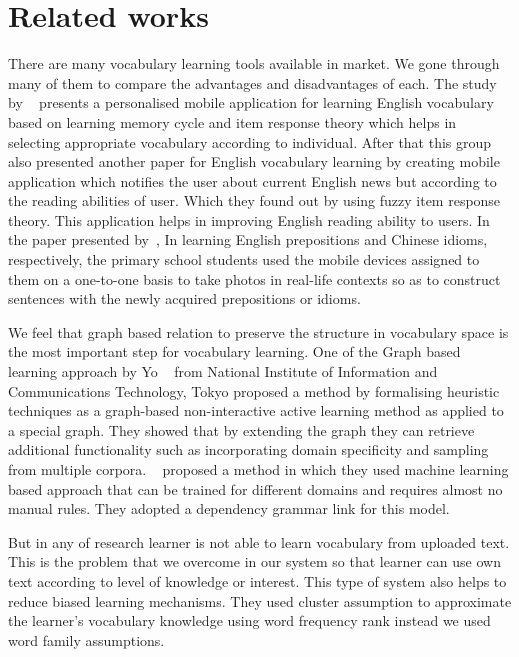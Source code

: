 \documentclass[11pt,a4paper]{article}
\begin{document}
\section{Related works}
There are many vocabulary learning tools available in market. We gone through many of them to compare the advantages and disadvantages of each. The study by ~\citet{chen2008personalized} presents a personalised mobile application for learning English vocabulary based on learning memory cycle and item response theory which helps in selecting appropriate vocabulary according to individual. After that this group also presented another paper for English vocabulary learning by creating mobile application which notifies the user about current English news but according to the reading abilities of user. Which they found out by using fuzzy item response theory. This application helps in improving English reading ability to users. In the paper presented by~\citet{wong2010mobile}, In learning English prepositions and Chinese idioms, respectively, the primary school students used the mobile devices assigned to them on a one-to-one basis to take photos in real-life contexts so as to construct sentences with the newly acquired prepositions or idioms. 

We feel that graph based relation to  preserve the structure in vocabulary space is the most important step for vocabulary learning. 
One of the Graph based learning approach by Yo ~\citet{ehara2014formalizing}  from National Institute of Information and Communications Technology, Tokyo proposed a method by formalising heuristic techniques as a graph-based non-interactive active learning method as applied to a special graph. They showed that by extending the graph they can retrieve additional functionality such as incorporating domain specificity and sampling from multiple corpora.
~\citet{zhang2001learning} proposed a method in which they used machine learning based approach that can be trained for different domains and requires almost no manual rules. They adopted a dependency grammar link for this model. 

But in any of research learner is not able to learn vocabulary from uploaded text. This is the problem that we overcome in our system so that learner can use own text according to level of knowledge or interest. This type of system also helps to reduce biased learning mechanisms.  They used cluster assumption to approximate the learner's vocabulary knowledge using word frequency rank instead we used word family assumptions. 
\end{document}
